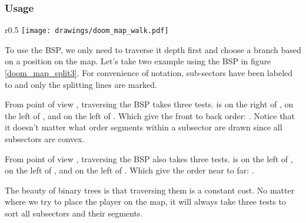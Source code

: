 \par

\subsubsection{Usage}

\begin{wrapfigure}[10]{r}{0.5\textwidth}
\centering
\texttt{[image: drawings/doom\_map\_walk.pdf]}
\end{wrapfigure}
To use the BSP, we only need to traverse it depth first and choose a branch based on a position on the map. Let's take two example using the BSP in figure \ref{doom_map_split3}. For convenience of notation, sub-sectors have been labeled  to  and only the splitting lines are marked.\\
\par
From point of view , traversing the BSP takes three tests.  is on the right of , on the left of , and on the left of . Which give the front to back order: . Notice that it doesn't matter what order segments within a subsector are drawn since all subsectors are convex.\\
\par
From point of view , traversing the BSP also takes three tests.  is on the left of , on the left of , and on the left of . Which give the order near to far: .\\
\par
The beauty of binary trees is that traversing them is a constant cost. No matter where we try to place the player on the map, it will always take three tests to sort all subsectors and their segments.
\pagebreak




